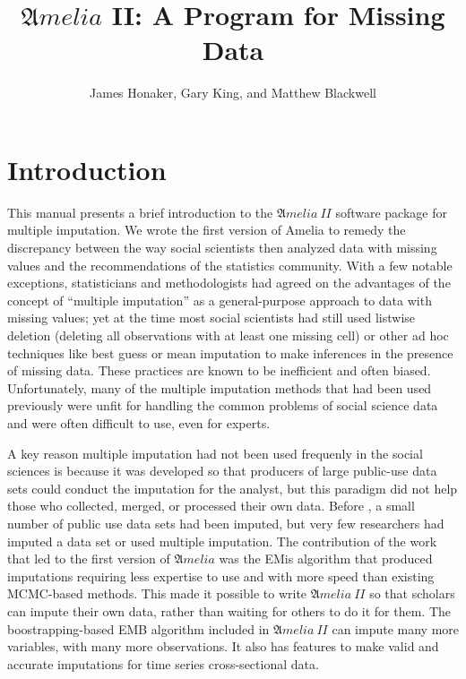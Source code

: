 \documentclass[12pt,titlepage]{article}
\title{${\mathfrak Amelia}$ II: A Program for Missing Data}
\author{James Honaker, Gary King, and Matthew Blackwell}
\newcommand{\Amelia}{\ensuremath{\mathfrak Amelia} }
\newcommand{\AmeliaII}{\ensuremath{\mathfrak Amelia~II} }
\begin{document}
\maketitle

\tableofcontents
\newpage



\section{Introduction}
\label{sec:intro}

This manual presents a brief introduction to the \AmeliaII software
package for multiple imputation.  We wrote the first version of Amelia
to remedy the discrepancy between the way social scientists then
analyzed data with missing values and the recommendations of the
statistics community.  With a few notable exceptions, statisticians
and methodologists had agreed on the advantages of the concept of
``multiple imputation'' as a general-purpose approach to data with
missing values; yet at the time most social scientists had still used
listwise deletion (deleting all observations with at least one missing
cell) or other ad hoc techniques like best guess or mean imputation to
make inferences in the presence of missing data.  These practices are
known to be inefficient and often biased.  Unfortunately, many of the
multiple imputation methods that had been used previously were unfit
for handling the common problems of social science data and were often
difficult to use, even for experts.

A key reason multiple imputation had not been used frequenly in the
social sciences is because it was developed so that producers of large
public-use data sets could conduct the imputation for the analyst, but
this paradigm did not help those who collected, merged, or processed
their own data.  Before \citet*{KinHonJos01}, a small number of public
use data sets had been imputed, but very few researchers had imputed a
data set or used multiple imputation.  The contribution of the work
that led to the first version of \Amelia was the EMis algorithm that
produced imputations requiring less expertise to use and with more
speed than existing MCMC-based methods.  This made it possible to
write \AmeliaII so that scholars can impute their own data, rather
than waiting for others to do it for them.  The boostrapping-based EMB
algorithm included in \AmeliaII can impute many more variables, with
many more observations.  It also has features to make valid and
accurate imputations for time series cross-sectional data.
\end{document}

